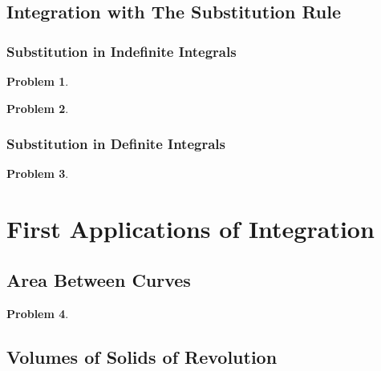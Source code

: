\documentclass{article}
\newtheorem{problem}{Problem}
\begin{document}
\subsection{Integration with The Substitution Rule}
\label{secMPSintegrationSubstitutionRule}
\subsubsection{Substitution in Indefinite Integrals}
\label{secMPSintegrationSubstitutionRuleIndefinite}
\begin{problem}

\end{problem}

\begin{problem}

\end{problem}


\subsubsection{Substitution in Definite Integrals}
\label{secMPSintegrationSubstitutionRuleDefinite}
\begin{problem}

\end{problem}


\section{First Applications of Integration}
\subsection{Area Between Curves}\label{secMPSareaBetweenCurves}
\begin{problem}

\end{problem}

\subsection{Volumes of Solids of Revolution}\label{secMPSvolumesSolidsRevolution}
\end{document}
